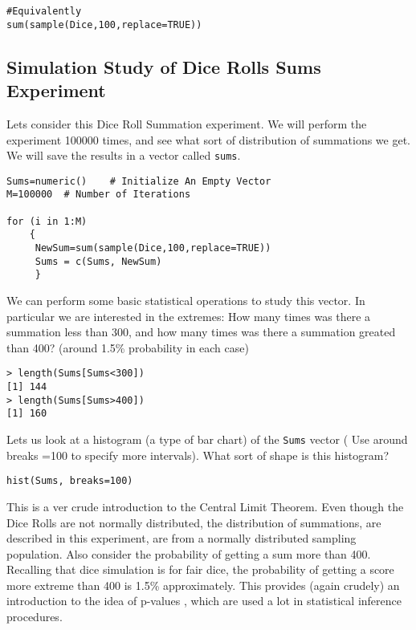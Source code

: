 \documentclass[11pt]{article} %
\begin{document}
\begin{framed}
\begin{verbatim}
#Equivalently
sum(sample(Dice,100,replace=TRUE))
\end{verbatim}
\end{framed}
\newpage
\subsection{Simulation Study of Dice Rolls Sums Experiment}
Lets consider this Dice Roll Summation experiment. We will perform the experiment 100000 times, and see what sort of distribution of summations we get.
We will save the results in a vector called \texttt{sums}.
\begin{framed}
\begin{verbatim}
Sums=numeric()    # Initialize An Empty Vector
M=100000  # Number of Iterations

for (i in 1:M)
    {
     NewSum=sum(sample(Dice,100,replace=TRUE))
     Sums = c(Sums, NewSum)
     }
\end{verbatim}
\end{framed}

We can perform some basic statistical operations to study this vector. In particular we are interested in the extremes: How many times was there a summation less than 300, and how many times was there a summation greated than 400? (around 1.5\% probability in each case)

\begin{verbatim}
> length(Sums[Sums<300])
[1] 144
> length(Sums[Sums>400])
[1] 160  
\end{verbatim}

Lets us look at a histogram (a type of bar chart) of the \texttt{Sums} vector ( Use around breaks =100 to specify more intervals). What sort of shape is this histogram?
\begin{framed}
\begin{verbatim}
hist(Sums, breaks=100)
\end{verbatim}
\end{framed}

This is a ver crude introduction to the Central Limit Theorem. Even though the Dice Rolls are not normally distributed, the distribution of summations, are described in this experiment, are from a normally distributed sampling population. Also consider the probability of getting a sum more than 400. Recalling that dice simulation is for fair dice, the probability of getting a score more extreme than 400 is 1.5\% approximately. This provides (again crudely) an introduction to the idea of p-values , which are used a lot in statistical inference procedures. 
\end{document}
